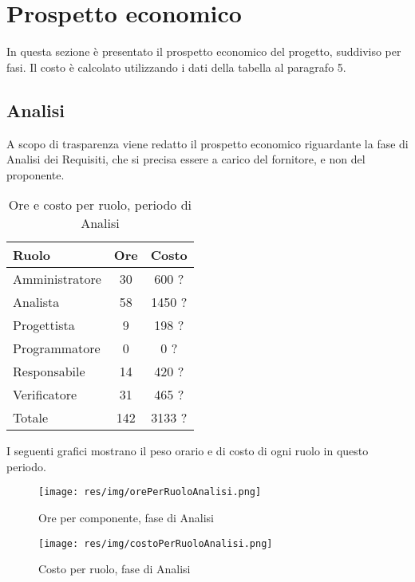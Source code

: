 \section{Prospetto economico}
In questa sezione è presentato il prospetto economico del progetto, suddiviso per fasi. Il costo è calcolato utilizzando i dati
della tabella al paragrafo 5.

\subsection{Analisi}
A scopo di trasparenza viene redatto il prospetto economico riguardante la fase di Analisi dei Requisiti, che si precisa essere a carico del fornitore, e non del proponente.

\begin{table}[H]
	\centering
	\begin{tabular}{ l c c }
		\textbf{Ruolo} & \textbf{Ore} & \textbf{Costo} \\
		\hline
		Amministratore & 30 & 600 ? \\
		Analista & 58 & 1450 ? \\
		Progettista & 9 & 198 ? \\
		Programmatore & 0 & 0 ? \\
		Responsabile & 14 & 420 ? \\
		Verificatore & 31 & 465 ? \\
		\hline
		Totale & 142 & 3133 ? \\
		\hline
	\end{tabular}
	\caption{Ore e costo per ruolo, periodo di Analisi}
\end{table}

I seguenti grafici mostrano il peso orario e di costo di ogni ruolo in questo periodo.

\begin{figure}[H]
  \begin{center}
    \texttt{[image: res/img/orePerRuoloAnalisi.png]}
  \caption{Ore per componente, fase di Analisi}
  \end{center} 
\end{figure}  

\begin{figure}[H]
  \begin{center}
    \texttt{[image: res/img/costoPerRuoloAnalisi.png]}
  \caption{Costo per ruolo, fase di Analisi}
  \end{center} 
\end{figure}  


